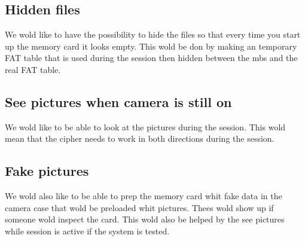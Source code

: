 \documentclass[]{article}
\begin{document}
\subsection{Hidden files}
We wold like to have the possibility to hide the files so that every time you start up the memory card it looks empty.
This wold be don by making an temporary FAT table that is used during the session then hidden between the \gls{mbs} and the real FAT table.

\subsection{See pictures when camera is still on}
We wold like to be able to look at the pictures during the session.
This wold mean that the cipher needs to work in both directions during the session.

\subsection{Fake pictures}
We wold also like to be able to prep the memory card whit fake data in the camera case that wold be preloaded whit pictures.
Thees wold show up if someone wold inspect the card.
This wold also be helped by the see pictures while session is active if the system is tested.




\clearpage
\newpage
\printglossary[type=\acronymtype]
\printnoidxglossaries


{}

\end{document}

